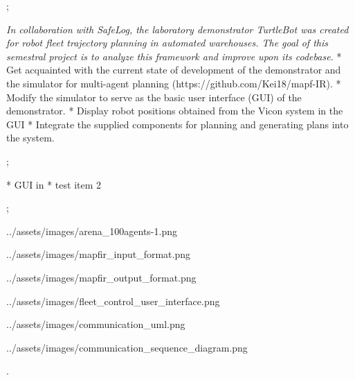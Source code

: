 

\worktype[B/EN]
\slideshow



\pg;


\textit {
    In collaboration with SafeLog, the laboratory demonstrator TurtleBot was created
    for robot fleet trajectory planning in automated warehouses. The goal of this semestral
    project is to analyze this framework and improve upon its codebase.
}
\begitems
* Get acquainted with the current state of development of the demonstrator and the simulator for multi-agent planning (https://github.com/Kei18/mapf-IR).
* Modify the simulator to serve as the basic user interface (GUI) of the demonstrator.
* Display robot positions obtained from the Vicon system in the GUI
* Integrate the supplied components for planning and generating plans into the system.
\enditems
\nl

\pg;






\begitems
* GUI in 
* test item 2
\enditems
\nl

\pg;



\centerline{\picw=14cm \inspic ../assets/images/arena_100agents-1.png }



\centerline{\picw=5cm \inspic ../assets/images/mapfir_input_format.png }
\centerline{\picw=5cm \inspic ../assets/images/mapfir_output_format.png }



\centerline{\picw=5cm \inspic ../assets/images/fleet_control_user_interface.png }



\centerline{\picw=5cm \inspic ../assets/images/communication_uml.png}



\centerline{\picw=5cm \inspic ../assets/images/communication_sequence_diagram.png}

\pg.

